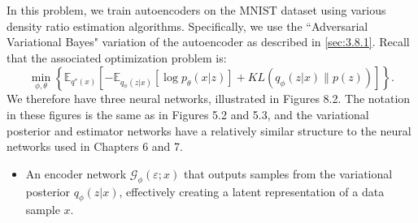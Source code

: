 \documentclass[honours,12pt, twoside]{unswthesis}
\newcommand{\E}{\mathbb{E}}
\numberwithin{equation}{section}
\theoremstyle{definition}
\begin{document}
In this problem, we train autoencoders on the MNIST dataset using various density ratio estimation algorithms. Specifically, we use the ``Adversarial Variational Bayes" variation of the autoencoder as described in \autoref{sec:3.8.1}. Recall that the associated optimization problem is:
\[\min_{\phi,\theta}\left\lbrace\E_{q^*(x)}\left[-\E_{q_\phi(z|x)}[\log p_\theta(x|z)]+KL(q_\phi(z|x)\|p(z))\right]\right\rbrace.\]
We therefore have three neural networks, illustrated in Figures 8.2. The notation in these figures is the same as in Figures 5.2 and 5.3, and the variational posterior and estimator networks have a relatively similar structure to the neural networks used in Chapters 6 and 7.
\begin{itemize}
\item An encoder network $\mathcal{G}_\phi(\varepsilon;x)$ that outputs samples from the variational posterior $q_\phi(z|x)$, effectively creating a latent representation of a data sample $x$.
\begin{figure}[h!]
\end{figure}
\end{itemize}
\end{document}
